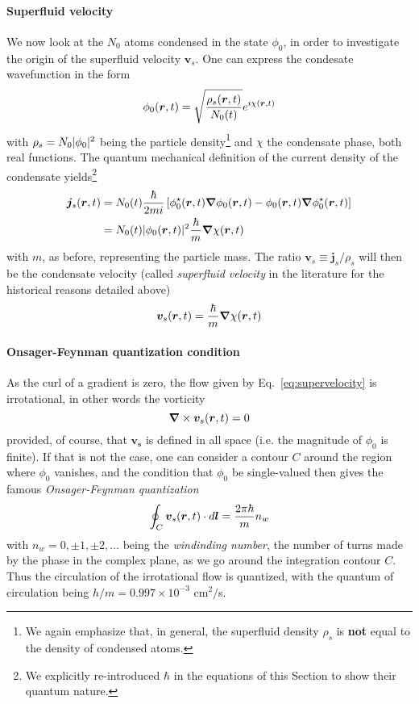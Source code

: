 \paragraph{Superfluid velocity}
We now look at the $N_0$ atoms condensed in the state $\phi_0$, in
order to investigate the origin of the superfluid velocity
$\bm{v}_s$. One can express the condesate wavefunction in the form
%
\begin{equation}\label{eq:label}
  \phi_0 (\bm{r}, t) = \sqrt{\frac{\rho_s(\bm{r},t)}{N_0(t)}} e^{i\chi(\bm{r},t)}
\end{equation}
% 
with $\rho_s = N_0\vert \phi_0 \vert^2$ being the particle
density\footnote{We again emphasize that, in general, the superfluid
  density $\rho_s$ is \textbf{not} equal to the density of condensed atoms.}
and $\chi$ the condensate phase, both real functions.
%
The quantum mechanical definition of the current density of the
condensate yields\footnote{We explicitly re-introduced $\hbar$ in the
  equations of this Section to show their quantum nature.}
\begin{align}\label{eq:bec-current}
  \bm{j}_s(\bm{r},t) & = N_0(t)\frac{\hbar}{2mi}\left[\phi_0^{\star}(\bm{r},t)\bm{\nabla}\phi_0(\bm{r},t) - \phi_0(\bm{r},t)\bm{\nabla}\phi_0^{\star}(\bm{r},t)\right]\\
& = N_0(t) \vert \phi_0(\bm{r},t) \vert^2 \frac{\hbar}{m} \bm{\nabla}\chi(\bm{r},t)
\end{align}
with $m$, as before, representing the particle mass. The ratio
$\bm{v}_s \equiv \bm{j}_s/\rho_s$ will then be the condensate velocity
(called \textit{superfluid velocity} in the literature for the
historical reasons detailed above)
%
\begin{equation}\label{eq:supervelocity}
  \bm{v}_s(\bm{r},t) = \frac{\hbar}{m} \bm{\nabla}\chi(\bm{r},t)
\end{equation}
% 

\paragraph{Onsager-Feynman quantization condition}
As the curl of a gradient is zero, the flow given by
Eq.~\eqref{eq:supervelocity} is irrotational, in other words the
vorticity
%
\begin{equation}\label{eq:vorticity}
  \bm{\nabla} \times \bm{v}_s(\bm{r},t) = 0  
\end{equation}
% 
provided, of course, that $\bm{v_s}$ is defined in all space (i.e.
the magnitude of $\phi_0$ is finite). If that is not the case, one can
consider a contour $C$ around the region where $\phi_0$ vanishes, and
the condition that $\phi_0$ be single-valued then gives the famous
\textit{Onsager-Feynman quantization}
%
\begin{equation}\label{eq:feynman}
  \oint_C \bm{v}_s(\bm{r},t) \cdot d\bm{l} = \frac{2\pi \hbar}{m} n_w
\end{equation}
% 
with $n_w = 0, \pm 1, \pm 2, \dots$ being the \textit{windinding
  number}, the number of turns made by the phase in the complex plane,
as we go around the integration contour $C$. Thus the circulation of
the irrotational flow is quantized, with the quantum of circulation
being $h/m = 0.997 \times 10^{-3}$ cm$^2/$s.

